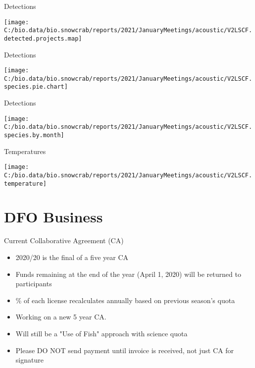 \documentclass[
  ignorenonframetext,
]{beamer}
\begin{document}
\begin{frame}{Detections}
\protect\hypertarget{detections}{}
\begin{center}\texttt{[image: C:/bio.data/bio.snowcrab/reports/2021/JanuaryMeetings/acoustic/V2LSCF.detected.projects.map]} \end{center}
\end{frame}

\begin{frame}{Detections}
\protect\hypertarget{detections-1}{}
\begin{center}\texttt{[image: C:/bio.data/bio.snowcrab/reports/2021/JanuaryMeetings/acoustic/V2LSCF.species.pie.chart]} \end{center}
\end{frame}

\begin{frame}{Detections}
\protect\hypertarget{detections-2}{}
\begin{center}\texttt{[image: C:/bio.data/bio.snowcrab/reports/2021/JanuaryMeetings/acoustic/V2LSCF.species.by.month]} \end{center}
\end{frame}

\begin{frame}{Temperatures}
\protect\hypertarget{temperatures-2}{}
\begin{center}\texttt{[image: C:/bio.data/bio.snowcrab/reports/2021/JanuaryMeetings/acoustic/V2LSCF.temperature]} \end{center}
\end{frame}

\hypertarget{dfo-business}{%
\section{DFO Business}\label{dfo-business}}

\begin{frame}{Current Collaborative Agreement (CA)}
\protect\hypertarget{current-collaborative-agreement-ca}{}
\begin{itemize}
\item
  2020/20 is the final of a five year CA
\item
  Funds remaining at the end of the year (April 1, 2020) will be
  returned to participants
\item
  \% of each license recalculates annually based on previous season's
  quota
\item
  Working on a new 5 year CA.
\item
  Will still be a "Use of Fish" approach with science quota
\item
  Please DO NOT send payment until invoice is received, not just CA for
  signature
\end{itemize}
\end{frame}
\end{document}
